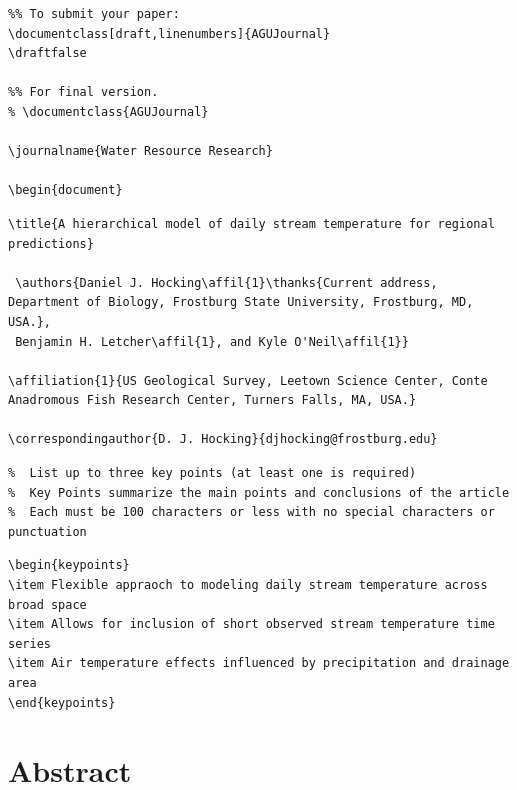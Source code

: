 \documentclass[]{article}
\date{}
\begin{document}
\begin{verbatim}
%% To submit your paper:
\documentclass[draft,linenumbers]{AGUJournal}
\draftfalse

%% For final version.
% \documentclass{AGUJournal}

\journalname{Water Resource Research}

\begin{document}
\end{verbatim}

\begin{verbatim}
\title{A hierarchical model of daily stream temperature for regional predictions}

 \authors{Daniel J. Hocking\affil{1}\thanks{Current address, Department of Biology, Frostburg State University, Frostburg, MD, USA.},
 Benjamin H. Letcher\affil{1}, and Kyle O'Neil\affil{1}}

\affiliation{1}{US Geological Survey, Leetown Science Center, Conte Anadromous Fish Research Center, Turners Falls, MA, USA.}

\correspondingauthor{D. J. Hocking}{djhocking@frostburg.edu}
\end{verbatim}

\begin{verbatim}
%  List up to three key points (at least one is required)
%  Key Points summarize the main points and conclusions of the article
%  Each must be 100 characters or less with no special characters or punctuation 
\end{verbatim}

\begin{verbatim}
\begin{keypoints}
\item Flexible appraoch to modeling daily stream temperature across broad space
\item Allows for inclusion of short observed stream temperature time series
\item Air temperature effects influenced by precipitation and drainage area
\end{keypoints}
\end{verbatim}

\section{Abstract}\label{abstract}
\end{document}

